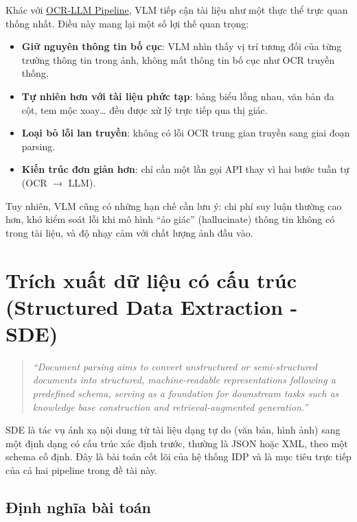 ﻿\documentclass[12pt]{report}
\begin{document}
Khác với \hyperref[sec:ocr_llm_pipeline]{OCR-LLM Pipeline}, VLM tiếp cận tài liệu như một thực thể trực quan thống nhất. Điều này mang lại một số lợi thế quan trọng:

\begin{itemize}
    \item \textbf{Giữ nguyên thông tin bố cục}: VLM nhìn thấy vị trí tương đối của từng trường thông tin trong ảnh, không mất thông tin bố cục như OCR truyền thống.
    \item \textbf{Tự nhiên hơn với tài liệu phức tạp}: bảng biểu lồng nhau, văn bản đa cột, tem mộc xoay\ldots{} đều được xử lý trực tiếp qua thị giác.
    \item \textbf{Loại bỏ lỗi lan truyền}: không có lỗi OCR trung gian truyền sang giai đoạn parsing.
    \item \textbf{Kiến trúc đơn giản hơn}: chỉ cần một lần gọi API thay vì hai bước tuần tự (OCR $\rightarrow$ LLM).
\end{itemize}

Tuy nhiên, VLM cũng có những hạn chế cần lưu ý: chi phí suy luận thường cao hơn, khó kiểm soát lỗi khi mô hình ``ảo giác'' (hallucinate) thông tin không có trong tài liệu, và độ nhạy cảm với chất lượng ảnh đầu vào.

\section{Trích xuất dữ liệu có cấu trúc (Structured Data Extraction - SDE)}\label{sec:structured_extraction}

\begin{quote}
\emph{``Document parsing aims to convert unstructured or semi-structured documents into structured, machine-readable representations following a predefined schema, serving as a foundation for downstream tasks such as knowledge base construction and retrieval-augmented generation.''} \cite{docparsing2024}
\end{quote}

SDE là tác vụ ánh xạ nội dung từ tài liệu dạng tự do (văn bản, hình ảnh) sang một định dạng có cấu trúc xác định trước, thường là JSON hoặc XML, theo một schema cố định. Đây là bài toán cốt lõi của hệ thống IDP và là mục tiêu trực tiếp của cả hai pipeline trong đề tài này.

\subsection{Định nghĩa bài toán}\label{sec:sde_definition}
\end{document}
